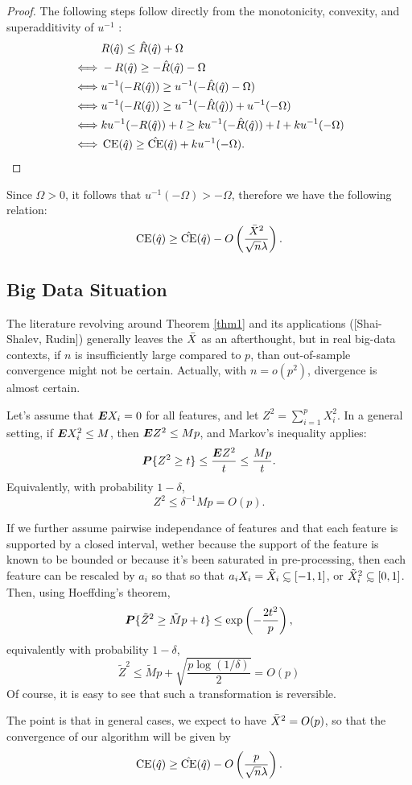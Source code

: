 \documentclass[11pt]{article}
\begin{document}
\begin{proof}
  The following steps follow directly from the monotonicity, convexity, and
  superadditivity of $u^{-1}$ :
  \begin{align*}
    & R(\hat q) \leq \hat R(\hat q) + \Omega\\
    \iff & -R(\hat q) \geq -\hat R(\hat q) - \Omega\\
    \iff & u^{-1}(-R(\hat q)) \geq u^{-1}(-\hat R(\hat q) - \Omega)\\
    \iff & u^{-1}(-R(\hat q)) \geq u^{-1}(-\hat R(\hat q)) + u^{-1}(-\Omega)\\
    \iff & ku^{-1}(-R(\hat q))+l \geq ku^{-1}(-\hat R(\hat q))+l + ku^{-1}(-\Omega)\\
    \iff & \operatorname{CE}(\hat q) \geq \hat{\operatorname{CE}}(\hat q) + ku^{-1}(-\Omega).\qedhere
  \end{align*}
\end{proof}

Since $\Omega>0$, it follows that $u^{-1}(-\Omega) > -\Omega$, therefore we have the
following relation:
\[
  \operatorname{CE}(\hat q) \geq \hat{\operatorname{CE}}(\hat q) - O\left(\frac{\bar X^2}{\sqrt{n}\lambda}\right).
\]


\subsection{Big Data Situation}

The literature revolving around Theorem \ref{thm1} and its applications ([Shai-Shalev,
Rudin]) generally leaves the $\bar X$ as an afterthought, but in real big-data contexts, if
$n$ is insufficiently large compared to $p$, than out-of-sample convergence might not be
certain. Actually, with $n=o(p^2)$, divergence is almost certain. 

Let's assume that $\bm E X_i = 0$ for all features, and let $Z^2 = \sum_{i=1}^p X_i^2$. In a
general setting, if $\bm E X_i^2 \leq M$, then $\bm E Z^2 \leq Mp$, and Markov's inequality
applies:
\[
  \bm P\{Z^2 \geq t\} \leq \frac{\bm E Z^2}{t} \leq \frac{Mp}{t}.
\]
Equivalently, with probability $1-\delta$, 
\[
  Z^2 \leq \delta^{-1}Mp = O(p).
\]

If we further assume pairwise independance of features and that each feature is supported
by a closed interval, wether because the support of the feature is known to be bounded or
because it's been saturated in pre-processing, then each feature can be rescaled by $a_i$
so that so that $a_iX_i = \tilde X_i \subsetsim[-1,1]$, or $\tilde X_i^2
\subsetsim[0,1]$. Then, using Hoeffding's theorem,
\[
  \bm P\{\tilde Z^2 \geq \tilde Mp + t\} \leq \exp\left(-\frac{2t^2}{p}\right),
\]
equivalently with probability $1-\delta$, 
\[
  \tilde Z^2 \leq \tilde Mp + \sqrt{\frac{p\log(1/\delta)}{2}} = O(p)
\]
Of course, it is easy to see that such a transformation is reversible. 

The point is that in general cases, we expect to have $\bar X^2 =O(p)$, so that the
convergence of our algorithm will be given by 
\[
  \operatorname{CE}(\hat q) \geq \hat{\operatorname{CE}}(\hat q) - O\left(\frac{p}{\sqrt{n}\lambda}\right).
\]



\end{document}

